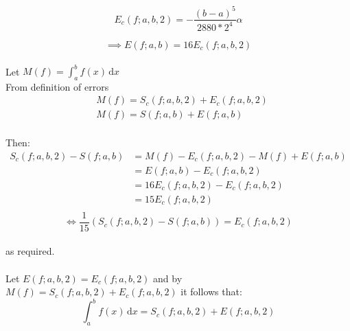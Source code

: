 \documentclass[fleqn]{report}
\begin{document}
\begin{equation}
E_c(f;a,b,2) = -\frac{(b - a)^5}{2880 * 2^4}\alpha
\end{equation}

\begin{equation}
\implies E(f;a,b) = 16E_c(f;a,b,2)
\end{equation}
\\
Let $M(f) = \int_a^b \! f(x) \, \mathrm{d}x$ \\
From definition of errors
\begin{equation}
\begin{split}
&M(f) = S_c(f;a,b,2) + E_c(f;a,b,2)\\
&M(f) = S(f;a,b) + E(f;a,b)
\end{split}
\end{equation}
\\
Then:
\begin{equation}
\begin{split}
S_c(f;a,b,2) - S(f;a,b) & = M(f) - E_c(f;a,b,2) - M(f) + E(f;a,b)\\
& = E(f;a,b) - E_c(f;a,b,2)\\
& = 16E_c(f;a,b,2) - E_c(f;a,b,2)\\
& = 15E_c(f;a,b,2)\\
\end{split}
\end{equation}
\begin{equation}
\iff \frac{1}{15}(S_c(f;a,b,2) - S(f;a,b)) = E_c(f;a,b,2)
\end{equation}
\\ as required.\\\\
Let $E(f;a,b,2) = E_c(f;a,b,2)$ and by $M(f) = S_c(f;a,b,2) + E_c(f;a,b,2)$ 
it follows that:\\
\begin{equation}
\int_a^b \! f(x) \, \mathrm{d}x  = S_c(f;a,b,2) + E(f;a,b,2)
\end{equation}
\end{document}
